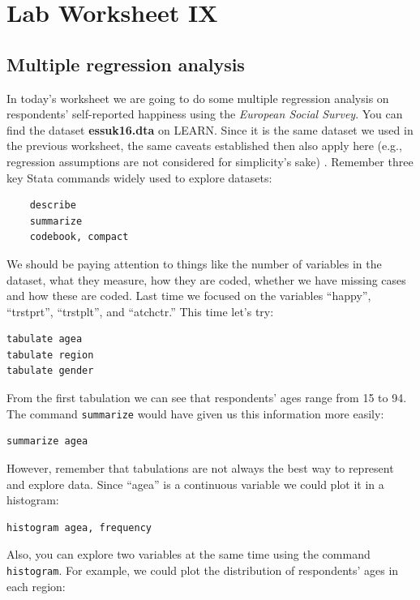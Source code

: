 \section{\hfil Lab Worksheet IX \hfil}
\subsection*{Multiple regression analysis}

In today's worksheet we are going to do some multiple regression analysis on respondents' self-reported happiness using the \textit{European Social Survey}. You can find the dataset \textbf{essuk16.dta} on LEARN. Since it is the same dataset we used in the previous worksheet, the same caveats established then also apply here (e.g., regression assumptions are not considered for simplicity's sake) . Remember three key Stata commands widely used to explore datasets:

\begin{lstlisting}
	describe
	summarize
	codebook, compact
\end{lstlisting}

We should be paying attention to things like the number of variables in the dataset, what they measure, how they are coded, whether we have missing cases and how these are coded. Last time we focused on the variables ``happy'', ``trstprt'', ``trstplt'', and ``atchctr.'' This time let's try:

\begin{lstlisting}
tabulate agea
tabulate region
tabulate gender
\end{lstlisting}

From the first tabulation we can see that respondents' ages range from 15 to 94. The command \texttt{summarize} would have given us this information more easily:

\begin{lstlisting}
summarize agea
\end{lstlisting}

However, remember that tabulations are not always the best way to represent and explore data. Since ``agea'' is a continuous variable we could plot it in a histogram:

\begin{lstlisting}
histogram agea, frequency
\end{lstlisting}

Also, you can explore two variables at the same time using the command \texttt{histogram}. For example, we could plot the distribution of respondents' ages in each region:

